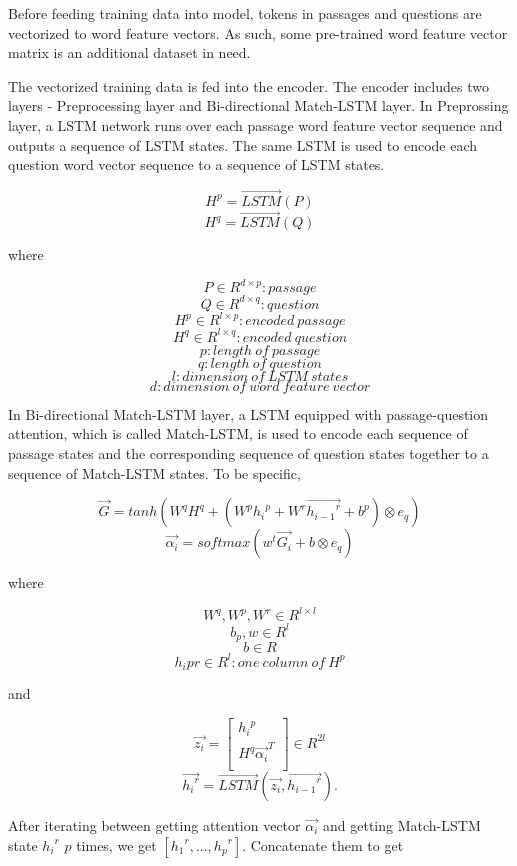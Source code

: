 \documentclass[modernstyle,12pt]{sjsuthesis}
\theoremstyle{definition}
\begin{document}
Before feeding training data into model, tokens in passages and questions are vectorized to word feature vectors. As such, some pre-trained word feature vector matrix is an additional dataset in need.

The vectorized training data is fed into the encoder. The encoder includes two layers - Preprocessing layer and Bi-directional Match-LSTM layer. In Preprossing layer, a LSTM network runs over each passage word feature vector sequence and outputs a sequence of LSTM states. The same LSTM is used to encode each question word vector sequence to a sequence of LSTM states.

$$H^p = \overrightarrow{LSTM}(P)$$
$$H^q = \overrightarrow{LSTM}(Q)$$

where

 $$P\in R^{d \times p}: passage$$
 $$Q\in R^{d \times q}: question$$
 $$H^p\in R^{l \times p}: encoded\ passage$$
 $$H^q\in R^{l \times q}: encoded\ question$$
 $$p: length \ of\ passage$$
 $$q: length\ of\ question$$
 $$l: dimension\ of\ LSTM\ states$$
 $$d: dimension\ of\ word\ feature\ vector$$

In Bi-directional Match-LSTM layer, a LSTM equipped with passage-question attention, which is called Match-LSTM, is used to encode each sequence of passage states and the corresponding sequence of question states together to a sequence of Match-LSTM states. To be specific,

$$\overrightarrow{G} = tanh(W^qH^q + (W^p{h_i}^p + W^r\overrightarrow{{h_{i-1}}^r} + b^p) \otimes e_q)$$
$$\overrightarrow{\alpha _i} = softmax(w^t\overrightarrow{G_i} + b \otimes e_q)$$


where

$$W^q, W^p, W^r\in R^{l \times l} $$
$$b_p, w\in R^{l}  $$
$$b \in R $$
$${{h_{i}}pr}\in R^{l}: one\ column\ of\ H^p  $$

and

\[ \overrightarrow{z_i} =
\begin{bmatrix}
{h_i}^p \\
H^q\overrightarrow{ {\alpha _i}}^T \\
\end{bmatrix}
\in R^{2l}
\]
$$\overrightarrow{{h_i}^r} = \overrightarrow{LSTM}(\overrightarrow{z_i}, \overrightarrow{{h_{i-1}}^r}).$$

After iterating between getting attention vector $\overrightarrow{\alpha _i}$ and getting Match-LSTM state ${{h_{i}}^r}$ $p$ times, we get $[{{h_{1}}^r}, ..., {{h_{p}}^r}]$. Concatenate them to get
\end{document}
